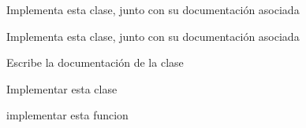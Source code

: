
\begin{DoxyRefList}
\item[\label{todo__todo000003}%
\hypertarget{todo__todo000003}{}%
Clase \hyperlink{classconjunto}{conjunto} ]Implementa esta clase, junto con su documentación asociada  
\item[\label{todo__todo000002}%
\hypertarget{todo__todo000002}{}%
Clase \hyperlink{classcrimen}{crimen} ]Implementa esta clase, junto con su documentación asociada 
\item[\label{todo__todo000001}%
\hypertarget{todo__todo000001}{}%
Clase \hyperlink{classfecha}{fecha} ]Escribe la documentación de la clase 

Implementar esta clase 
\item[\label{todo__todo000004}%
\hypertarget{todo__todo000004}{}%
Miembro \hyperlink{conjunto_8h_ae54b721035471d372f29c0335c42734a}{operator$<$$<$} (ostream \&sal, const conjunto \&D)]implementar esta funcion 
\end{DoxyRefList}